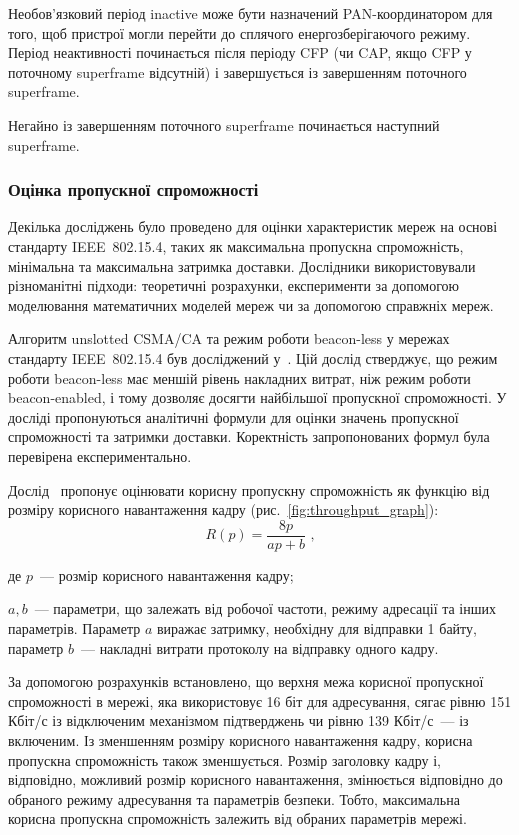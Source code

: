 \documentclass[a4paper,ukrainian,utf8,nocolumnsxix,floatsection,equationsection]{eskdtext}
\renewcommand\paragraph{\subsubsection}
\newcommand{\figref}[1]{рис.~\ref{#1}}
\newcommand{\iee}[0]{IEEE~802.15.4\xspace}
\newcommand{\csma}[0]{CSMA/CA\xspace}
\newcommand{\ucsma}[0]{unslotted \csma\xspace}
\newcommand{\blm}[0]{beacon-less\xspace}
\newcommand{\bem}[0]{beacon-enabled\xspace}
\begin{document}
Необов'язковий період inactive може бути назначений PAN-координатором для того, щоб пристрої могли перейти до сплячого енергозберігаючого режиму. Період неактивності починається після періоду CFP (чи CAP, якщо CFP у поточному superframe відсутній) і завершується із завершенням поточного superframe.

Негайно із завершенням поточного superframe починається наступний superframe. 

\paragraph{Оцінка пропускної спроможності}
\label{par:throughput:evaluation}

Декілька досліджень було проведено для оцінки характеристик мереж на основі стандарту \iee, таких як максимальна пропускна спроможність, мінімальна та максимальна затримка доставки. Дослідники використовували різноманітні підходи: теоретичні розрахунки, експерименти за допомогою моделювання математичних моделей мереж чи за допомогою справжніх мереж.

Алгоритм \ucsma та режим роботи \blm у мережах стандарту \iee був досліджений у~\cite{thoroughput:analysis:unslotted:ieee}. Цій дослід стверджує, що режим роботи \blm має меншій рівень накладних витрат, ніж режим роботи \bem, і тому дозволяє досягти найбільшої пропускної спроможності. У досліді пропонуються аналітичні формули для оцінки значень пропускної спроможності та затримки доставки. Коректність запропонованих формул була перевірена експериментально.

Дослід~\cite{thoroughput:analysis:unslotted:ieee} пропонує оцінювати корисну пропускну спроможність як функцію від розміру корисного навантаження кадру (\figref{fig:throughput_graph}):
\begin{equation}\label{eq:throughput}
	R(p) = \frac{8p}{ap + b} \text{ ,}
\end{equation}

де $p$~--- розмір корисного навантаження кадру;

$a,b$~--- параметри, що залежать від робочої частоти, режиму адресації та інших параметрів. Параметр $a$ виражає затримку, необхідну для відправки 1 байту, параметр $b$~--- накладні витрати протоколу на відправку одного кадру.

За допомогою розрахунків встановлено, що верхня межа корисної пропускної спроможності в мережі, яка використовує 16 біт для адресування, сягає рівню 151 Кбіт/с із відключеним механізмом підтверджень чи рівню 139 Кбіт/с~--- із включеним. Із зменшенням розміру корисного навантаження кадру, корисна пропускна спроможність також зменшується. Розмір заголовку кадру і, відповідно, можливий розмір корисного навантаження, змінюється відповідно до обраного режиму адресування та параметрів безпеки. Тобто, максимальна корисна пропускна спроможність залежить від обраних параметрів мережі.
\end{document}
